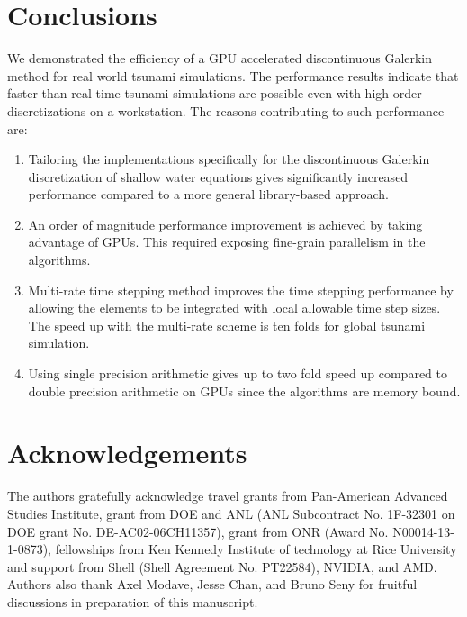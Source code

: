 

\section{Conclusions}
We demonstrated the efficiency of a GPU accelerated discontinuous Galerkin method for real world tsunami simulations. The performance results indicate that faster than real-time tsunami simulations are possible even with high order discretizations on a workstation.  The reasons contributing to such performance are: 
\begin{enumerate}
\item Tailoring the implementations specifically for the discontinuous Galerkin discretization of shallow water equations gives significantly increased performance compared to a more general library-based approach.
\item An order of magnitude performance improvement is achieved by taking advantage of GPUs. This required exposing fine-grain parallelism in the algorithms. \item Multi-rate time stepping method improves the time stepping performance by allowing the elements to be integrated with local allowable time step sizes. The speed up with the multi-rate scheme is ten folds for global tsunami simulation. 
\item Using single precision arithmetic gives up to  two fold speed up compared to double precision arithmetic on GPUs since the algorithms are memory bound.  
\end{enumerate}
\section*{Acknowledgements}
The authors gratefully acknowledge travel grants from Pan-American Advanced Studies Institute,  grant from DOE and ANL (ANL Subcontract No. 1F-32301 on DOE grant No. DE-AC02-06CH11357),  grant from ONR (Award No. N00014-13-1-0873),  fellowships from Ken Kennedy Institute of technology at Rice University and support from Shell (Shell Agreement No. PT22584), NVIDIA, and AMD.  Authors also thank  Axel Modave, Jesse Chan, and Bruno Seny for fruitful discussions in preparation of this manuscript.
